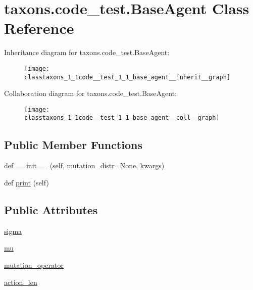 \hypertarget{classtaxons_1_1code__test_1_1_base_agent}{}\section{taxons.\+code\+\_\+test.\+Base\+Agent Class Reference}
\label{classtaxons_1_1code__test_1_1_base_agent}


Inheritance diagram for taxons.\+code\+\_\+test.\+Base\+Agent\+:
\nopagebreak
\begin{figure}[H]
\begin{center}
\leavevmode
\texttt{[image: classtaxons\_1\_1code\_\_test\_1\_1\_base\_agent\_\_inherit\_\_graph]}
\end{center}
\end{figure}


Collaboration diagram for taxons.\+code\+\_\+test.\+Base\+Agent\+:
\nopagebreak
\begin{figure}[H]
\begin{center}
\leavevmode
\texttt{[image: classtaxons\_1\_1code\_\_test\_1\_1\_base\_agent\_\_coll\_\_graph]}
\end{center}
\end{figure}
\subsection*{Public Member Functions}
\begin{DoxyCompactItemize}
\item 
def \hyperlink{classtaxons_1_1code__test_1_1_base_agent_a6c54d5b79ff3d4295e78b494fe74383d}{\+\_\+\+\_\+init\+\_\+\+\_\+} (self, mutation\+\_\+distr=None, kwargs)
\item 
def \hyperlink{classtaxons_1_1code__test_1_1_base_agent_ac02bb117c80cfcde54a35031e86f97d8}{print} (self)
\end{DoxyCompactItemize}
\subsection*{Public Attributes}
\begin{DoxyCompactItemize}
\item 
\hyperlink{classtaxons_1_1code__test_1_1_base_agent_a7ae0a7c58908d5475b5a4818fe98e45a}{sigma}
\item 
\hyperlink{classtaxons_1_1code__test_1_1_base_agent_a207e8e003b6e99c49e376a2182f51ad4}{mu}
\item 
\hyperlink{classtaxons_1_1code__test_1_1_base_agent_a84f8c56e256be355cee0537898048dc2}{mutation\+\_\+operator}
\item 
\hyperlink{classtaxons_1_1code__test_1_1_base_agent_a2128a68fe9293d12cc868ecaf6b106d7}{action\+\_\+len}
\end{DoxyCompactItemize}


